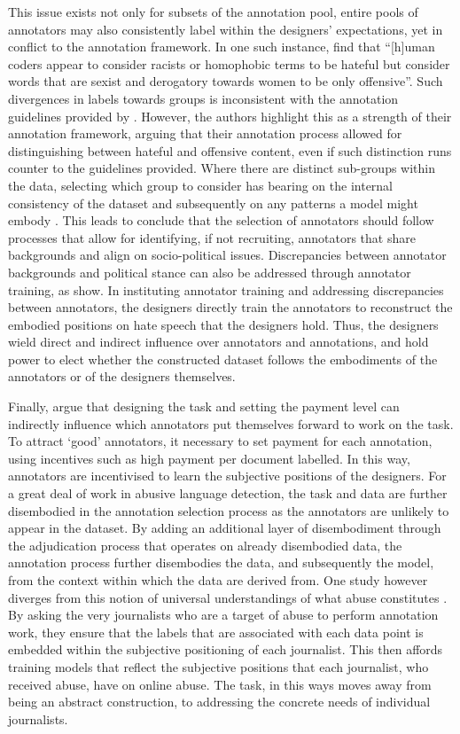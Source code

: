 {This issue exists not only for subsets of the annotation pool, entire pools of annotators may also consistently label within the designers' expectations, yet in conflict to the annotation framework.
In one such instance, \citet{Davidson:2017} find that ``[h]uman coders appear to consider racists or homophobic terms to be hateful but consider words that are sexist and derogatory towards women to be only offensive''.
Such divergences in labels towards groups is inconsistent with the annotation guidelines provided by \citet{Davidson:2017}.
However, the authors highlight this as a strength of their annotation framework, arguing that their annotation process allowed for distinguishing between hateful and offensive content, even if such distinction runs counter to the guidelines provided.
Where there are distinct sub-groups within the data, selecting which group to consider has bearing on the internal consistency of the dataset and subsequently on any patterns a model might embody \citep{Waseem:2016}.
This leads \citep{Waseem:2016} to conclude that the selection of annotators should follow processes that allow for identifying, if not recruiting, annotators that share backgrounds and align on socio-political issues.
Discrepancies between annotator backgrounds and political stance can also be addressed through annotator training, as \citet{Vidgen:2020} show.
In instituting annotator training and addressing discrepancies between annotators, the designers directly train the annotators to reconstruct the embodied positions on hate speech that the designers hold.
Thus, the designers wield direct and indirect influence over annotators and annotations, and hold power to elect whether the constructed dataset follows the embodiments of the annotators or of the designers themselves.

Finally, \citet{Sabou:2014} argue that designing the task and setting the payment level can indirectly influence which annotators put themselves forward to work on the task.
To attract `good' annotators, it necessary to set payment for each annotation, using incentives such as high payment per document labelled.
In this way, annotators are incentivised to learn the subjective positions of the designers.
For a great deal of work in abusive language detection, the task and data are further disembodied in the annotation selection process as the annotators are unlikely to appear in the dataset.
By adding an additional layer of disembodiment through the adjudication process that operates on already disembodied data, the annotation process further disembodies the data, and subsequently the model, from the context within which the data are derived from.
One study however diverges from this notion of universal understandings of what abuse constitutes \citep{Arora:2020}.
By asking the very journalists who are a target of abuse to perform annotation work, they ensure that the labels that are associated with each data point is embedded within the subjective positioning of each journalist.
This then affords training models that reflect the subjective positions that each journalist, who received abuse, have on online abuse.
The task, in this ways moves away from being an abstract construction, to addressing the concrete needs of individual journalists.

}
